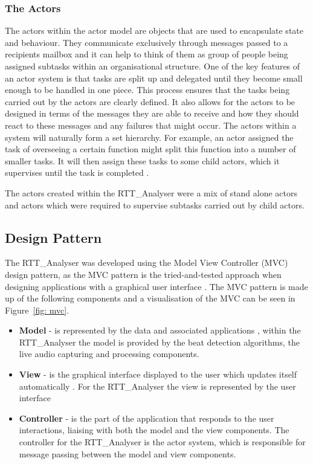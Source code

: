 \documentclass[a4paper, 11pt]{article}
\begin{document}
\subsubsection{The Actors}
The actors within the actor model are objects that are used to encapsulate state and behaviour. They communicate exclusively through messages passed to a recipients mailbox and it can help to think of them as group of people being assigned subtasks within an organisational structure. One of the key features of an actor system is that tasks are split up and delegated until they become small enough to be handled in one piece. This process ensures that the tasks being carried out by the actors are clearly defined. It also allows for the actors to be designed in terms of the messages they are able to receive and how they should react to these messages and any failures that might occur. The actors within a system will naturally form a set hierarchy. For example, an actor assigned the task of overseeing a certain function might split this function into a number of smaller tasks. It will then assign these tasks to some child actors, which it supervises until the task is completed \cite{acotrsys}.\par 

The actors created within the RTT\_Analyser were a mix of stand alone actors and actors which were required to supervise subtasks carried out by child actors.

\subsection{Design Pattern}
The RTT\_Analyser was developed using the Model View Controller (MVC) design pattern, as the MVC pattern is the tried-and-tested approach when designing applications with a graphical user interface \cite{designPatterns}. The MVC pattern is made up of the following components and a visualisation of the MVC can be seen in Figure~\ref{fig: mvc}. 

\begin{itemize}
\item \textbf{Model} - is represented by the data and associated applications \cite{designPatterns}, within the RTT\_Analyser the model is provided by the beat detection algorithms, the live audio capturing and processing components.\\
\item \textbf{View} - is the graphical interface displayed to the user which updates itself automatically \cite{designPatterns}. For the RTT\_Analyser the view is represented by the user interface\\
\item \textbf{Controller} - is the part of the application that responds to the user interactions, liaising with both the model and the view components\cite{designPatterns}. The controller for the RTT\_Analyser is the actor system, which is responsible for message passing between the model and view components.
\end{itemize}
\end{document}
